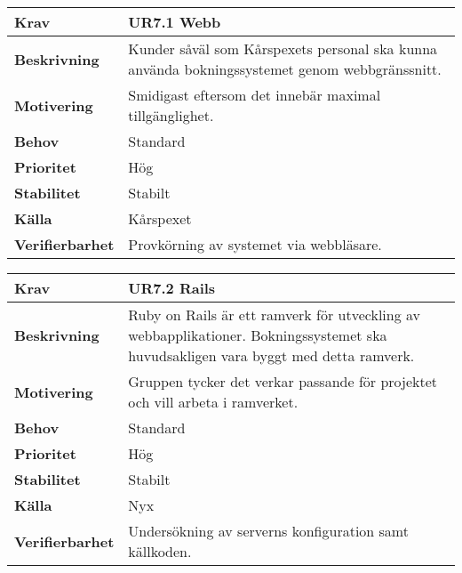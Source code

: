 \documentclass[a4paper, twoside, 11pt, titlepage]{article}
\begin{document}
		\begin{tabular} { p{2.6cm} p{12.5cm} }
			\hline
			\sffamily\textbf{Krav} & \sffamily\textbf{UR7.1 Webb } \\
			\hline
			\sffamily\textbf{Beskrivning} & Kunder såväl som Kårspexets personal ska kunna använda bokningssystemet genom webbgränssnitt.  \\
			\hline
			\sffamily\textbf{Motivering} & Smidigast eftersom det innebär maximal tillgänglighet.  \\
			\hline
			\sffamily\textbf{Behov} & Standard  \\
			\hline
			\sffamily\textbf{Prioritet} & Hög  \\
			\hline
			\sffamily\textbf{Stabilitet} & Stabilt  \\
			\hline
			\sffamily\textbf{Källa} & Kårspexet  \\
			\hline
			\sffamily\textbf{Verifierbarhet} & Provkörning av systemet via webbläsare.  \\
			\hline
		\end{tabular}
		\vspace{6mm}

		\begin{tabular} { p{2.6cm} p{12.5cm} }
			\hline
			\sffamily\textbf{Krav} & \sffamily\textbf{UR7.2 Rails } \\
			\hline
			\sffamily\textbf{Beskrivning} & Ruby on Rails är ett ramverk för utveckling av webbapplikationer. Bokningssystemet ska huvudsakligen vara byggt med detta ramverk.  \\
			\hline
			\sffamily\textbf{Motivering} & Gruppen tycker det verkar passande för projektet och vill arbeta i ramverket.  \\
			\hline
			\sffamily\textbf{Behov} & Standard  \\
			\hline
			\sffamily\textbf{Prioritet} & Hög  \\
			\hline
			\sffamily\textbf{Stabilitet} & Stabilt  \\
			\hline
			\sffamily\textbf{Källa} & Nyx  \\
			\hline
			\sffamily\textbf{Verifierbarhet} & Undersökning av serverns konfiguration samt källkoden.  \\
			\hline
		\end{tabular}
		\vspace{6mm}
\end{document}
